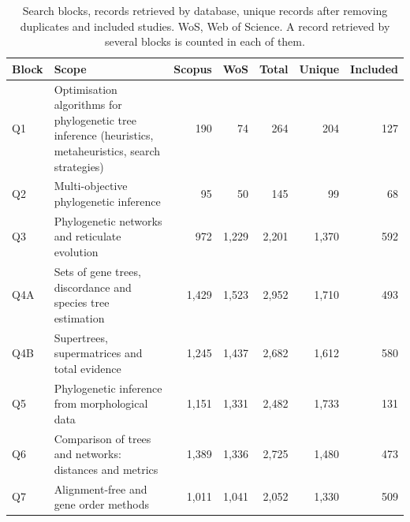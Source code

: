 \begin{table}[!htbp]
\centering
\scriptsize
\setlength{\tabcolsep}{3pt}
\caption{Search blocks, records retrieved by database, unique records after removing duplicates and included studies. WoS, Web of Science. A record retrieved by several blocks is counted in each of them.}
\label{tab:blocks}
\begin{tabular}{l>{\raggedright\arraybackslash}p{5.0cm}rrrrr}
\toprule
Block & Scope & Scopus & WoS & Total & Unique & Included\\
\midrule
Q1 & Optimisation algorithms for phylogenetic tree inference (heuristics, metaheuristics, search strategies) & 190 & 74 & 264 & 204 & 127\\
Q2 & Multi-objective phylogenetic inference & 95 & 50 & 145 & 99 & 68\\
Q3 & Phylogenetic networks and reticulate evolution & 972 & 1,229 & 2,201 & 1,370 & 592\\
Q4A & Sets of gene trees, discordance and species tree estimation & 1,429 & 1,523 & 2,952 & 1,710 & 493\\
Q4B & Supertrees, supermatrices and total evidence & 1,245 & 1,437 & 2,682 & 1,612 & 580\\
Q5 & Phylogenetic inference from morphological data & 1,151 & 1,331 & 2,482 & 1,733 & 131\\
Q6 & Comparison of trees and networks: distances and metrics & 1,389 & 1,336 & 2,725 & 1,480 & 473\\
Q7 & Alignment-free and gene order methods & 1,011 & 1,041 & 2,052 & 1,330 & 509\\
\bottomrule
\end{tabular}
\end{table}
